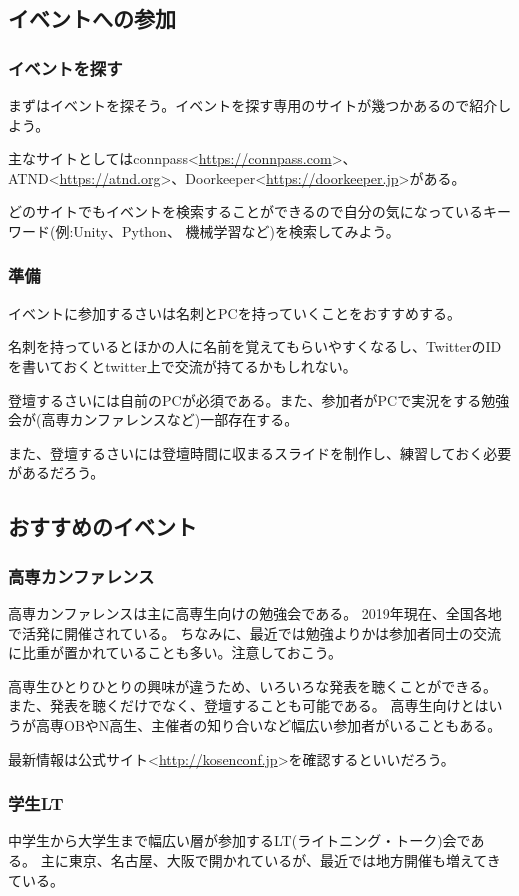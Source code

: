\documentclass[lualatex,ja=standard,12pt,a4j]{bxjsbook}
\begin{document}
			\subsection{イベントへの参加}
				\subsubsection{イベントを探す}
					まずはイベントを探そう。イベントを探す専用のサイトが幾つかあるので紹介しよう。
					
					主なサイトとしてはconnpass<\url{https://connpass.com}>、ATND<\url{https://atnd.org}>、Doorkeeper<\url{https://doorkeeper.jp}>がある。
					
					どのサイトでもイベントを検索することができるので自分の気になっているキーワード(例:Unity、Python、 機械学習など)を検索してみよう。
				\subsubsection{準備}
					イベントに参加するさいは名刺とPCを持っていくことをおすすめする。
					
					名刺を持っているとほかの人に名前を覚えてもらいやすくなるし、TwitterのIDを書いておくとtwitter上で交流が持てるかもしれない。
					
					登壇するさいには自前のPCが必須である。また、参加者がPCで実況をする勉強会が(高専カンファレンスなど)一部存在する。
					
					また、登壇するさいには登壇時間に収まるスライドを制作し、練習しておく必要があるだろう。
			\subsection{おすすめのイベント}
				\subsubsection{高専カンファレンス}
					高専カンファレンスは主に高専生向けの勉強会である。
					2019年現在、全国各地で活発に開催されている。
					ちなみに、最近では勉強よりかは参加者同士の交流に比重が置かれていることも多い。注意しておこう。
					
					高専生ひとりひとりの興味が違うため、いろいろな発表を聴くことができる。
					また、発表を聴くだけでなく、登壇することも可能である。
					高専生向けとはいうが高専OBやN高生、主催者の知り合いなど幅広い参加者がいることもある。
					
					最新情報は公式サイト<\url{http://kosenconf.jp}>を確認するといいだろう。
				\subsubsection{学生LT}
					中学生から大学生まで幅広い層が参加するLT(ライトニング・トーク)会である。
					主に東京、名古屋、大阪で開かれているが、最近では地方開催も増えてきている。
					
\end{document}
